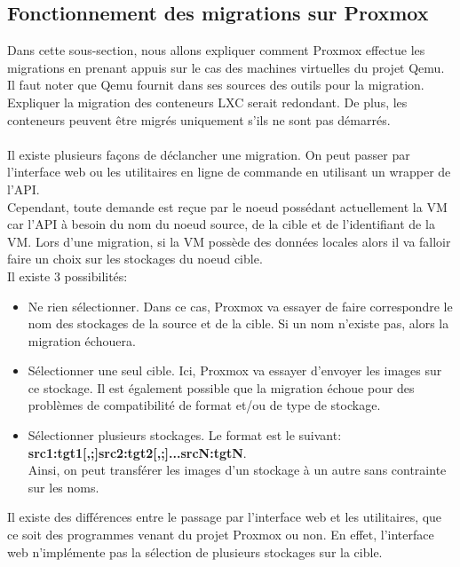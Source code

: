 \documentclass[14pt]{extarticle}
\begin{document}
    \subsection{Fonctionnement des migrations sur Proxmox}
    Dans cette sous-section, nous allons expliquer comment Proxmox effectue les migrations en prenant appuis sur le cas des machines virtuelles du projet Qemu. Il faut noter que Qemu fournit dans ses sources des outils pour la migration.\\
    Expliquer la migration des conteneurs LXC serait redondant. De plus, les conteneurs peuvent être migrés uniquement s'ils ne sont pas démarrés.\\
    \\
    Il existe plusieurs façons de déclancher une migration. On peut passer par l'interface web ou les utilitaires en ligne de commande en utilisant un wrapper de l'API.\\
    Cependant, toute demande est reçue par le noeud possédant actuellement la VM car l'API à besoin du nom du noeud source, de la cible et de l'identifiant de la VM. Lors d'une migration, si la VM possède des données locales alors il va falloir faire un choix sur les stockages du noeud cible.\\
    Il existe 3 possibilités:
    \begin{itemize}[nosep,label=\textendash]
        \item Ne rien sélectionner. Dans ce cas, Proxmox va essayer de faire correspondre le nom des stockages de la source et de la cible. Si un nom n'existe pas, alors la migration échouera.
        \item Sélectionner une seul cible. Ici, Proxmox va essayer d'envoyer les images sur ce stockage. Il est également possible que la migration échoue pour des problèmes de compatibilité de format et/ou de type de stockage.
        \item Sélectionner plusieurs stockages. Le format est le suivant:\\
        \shorthandoff{:}\textbf{src1:tgt1[,;]src2:tgt2[,;]...srcN:tgtN}\shorthandon{:}.\\
        Ainsi, on peut transférer les images d'un stockage à un autre sans contrainte sur les noms.
    \end{itemize}
    Il existe des différences entre le passage par l'interface web et les utilitaires, que ce soit des programmes venant du projet Proxmox ou non. En effet, l'interface web n'implémente pas la sélection de plusieurs stockages sur la cible.\\
\end{document}
